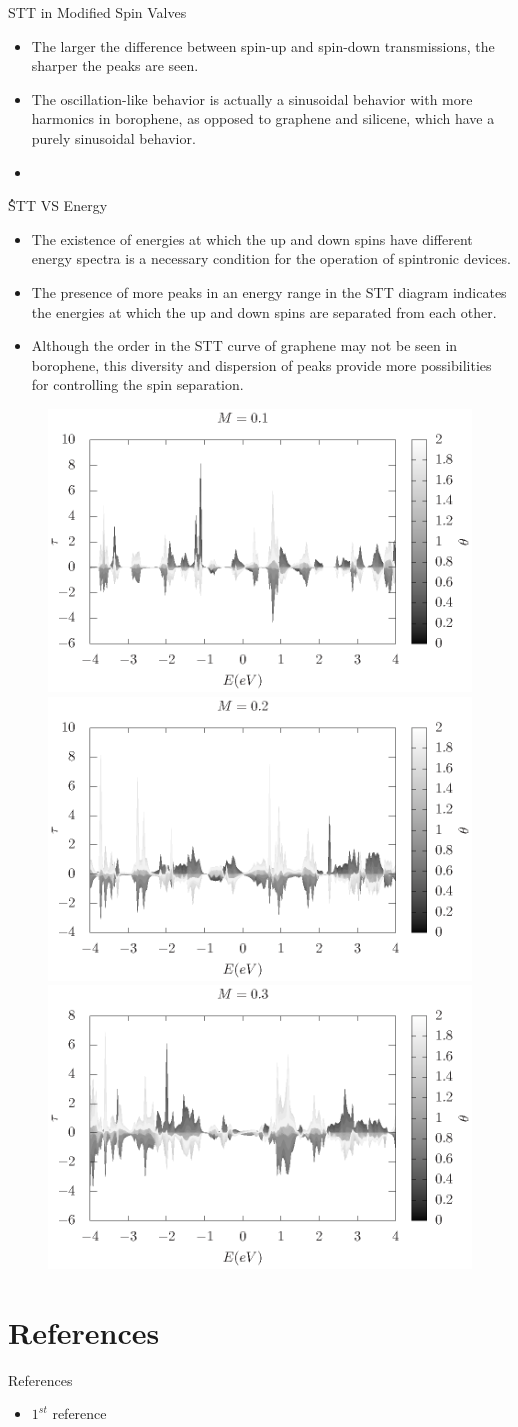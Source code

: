 \documentclass[handout,t]{beamer}
\begin{document}
\begin{frame}{STT in Modified Spin Valves}
	\begin{itemize}
		\item The larger the difference between spin-up and spin-down transmissions, the sharper the peaks are seen.
		\item The oscillation-like behavior is actually a sinusoidal behavior with more harmonics in borophene, as opposed to graphene and silicene, which have a purely sinusoidal behavior.
		\item 
	\end{itemize}
\end{frame}
\begin{frame}{ُSTT VS Energy}
	\begin{itemize}
		\item The existence of energies at which the up and down spins have different energy spectra is a necessary condition for the operation of spintronic devices.
		\item The presence of more peaks in an energy range in the STT diagram indicates the energies at which the up and down spins are separated from each other.
		\item Although the order in the STT curve of graphene may not be seen in borophene, this diversity and dispersion of peaks provide more possibilities for controlling the spin separation.
	\end{itemize}
	\begin{figure}
		\centering
		\includegraphics[width=0.33\linewidth]{../figures/stt-energy3d-01-thesis.eps}
		\includegraphics[width=0.33\linewidth]{../figures/stt-energy3d-02-thesis.eps}\includegraphics[width=0.33\linewidth]{../figures/stt-energy3d-03-thesis.eps}
	\end{figure}
\end{frame}

\section{References}
\begin{frame}{References}
\begin{itemize}
\item $1^{st}$ reference
\end{itemize}
\end{frame}
\end{document}
